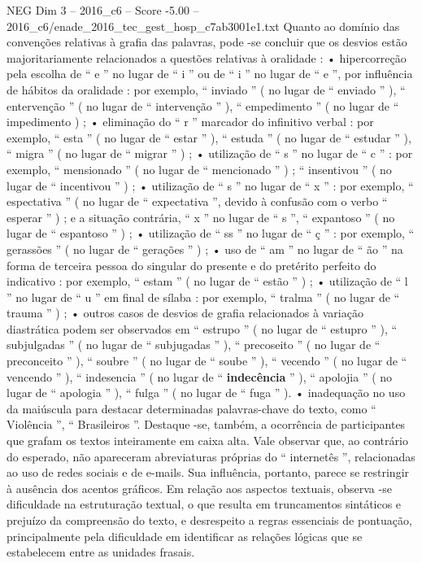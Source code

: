 \begin{textsample}{NEG Dim 3 – 2016\_c6 – Score -5.00 – 2016\_c6/enade\_2016\_tec\_gest\_hosp\_c7ab3001e1.txt}
Quanto ao domínio das convenções relativas à grafia das palavras, pode -se concluir que os desvios estão majoritariamente relacionados a questões relativas à oralidade : • hipercorreção pela escolha de “ e ” no lugar de “ i ” ou de “ i ” no lugar de “ e ”, por influência de hábitos da oralidade : por exemplo, “ inviado ” ( no lugar de “ enviado ” ), “ entervenção ” ( no lugar de “ intervenção ” ), “ empedimento ” ( no lugar de “ impedimento ) ; • eliminação do “ r ” marcador do infinitivo verbal : por exemplo, “ esta ” ( no lugar de “ estar ” ), “ estuda ” ( no lugar de “ estudar ” ), “ migra ” ( no lugar de “ migrar ” ) ; • utilização de “ s ” no lugar de “ c ” : por exemplo, “ mensionado ” ( no lugar de “ mencionado ” ) ; “ insentivou ” ( no lugar de “ incentivou ” ) ; • utilização de “ s ” no lugar de “ x ” : por exemplo, “ espectativa ” ( no lugar de “ expectativa ”, devido à confusão com o verbo “ esperar ” ) ; e a situação contrária, “ x ” no lugar de “ s ”, “ expantoso ” ( no lugar de “ espantoso ” ) ; • utilização de “ ss ” no lugar de “ ç ” : por exemplo, “ gerassões ” ( no lugar de “ gerações ” ) ; • uso de “ am ” no lugar de “ ão ” na forma de terceira pessoa do singular do presente e do pretérito perfeito do indicativo : por exemplo, “ estam ” ( no lugar de “ estão ” ) ; • utilização de “ l ” no lugar de “ u ” em final de sílaba : por exemplo, “ tralma ” ( no lugar de “ trauma ” ) ; • outros casos de desvios de grafia relacionados à variação diastrática podem ser observados em “ estrupo ” ( no lugar de “ estupro ” ), “ subjulgadas ” ( no lugar de “ subjugadas ” ), “ precoseito ” ( no lugar de “ preconceito ” ), “ soubre ” ( no lugar de “ soube ” ), “ vecendo ” ( no lugar de “ vencendo ” ), “ indesencia ” ( no lugar de “ \textbf{indecência} ” ), “ apolojia ” ( no lugar de “ apologia ” ), “ fulga ” ( no lugar de “ fuga ” ). • inadequação no uso da maiúscula para destacar determinadas palavras-chave do texto, como “ Violência ”, “ Brasileiros ”.
Destaque -se, também, a ocorrência de participantes que grafam os textos inteiramente em caixa alta.
Vale observar que, ao contrário do esperado, não apareceram abreviaturas próprias do “ internetês ”, relacionadas ao uso de redes sociais e de e-mails.
Sua influência, portanto, parece se restringir à ausência dos acentos gráficos.
Em relação aos aspectos textuais, observa -se dificuldade na estruturação textual, o que resulta em truncamentos sintáticos e prejuízo da compreensão do texto, e desrespeito a regras essenciais de pontuação, principalmente pela dificuldade em identificar as relações lógicas que se estabelecem entre as unidades frasais.

\end{textsample}
